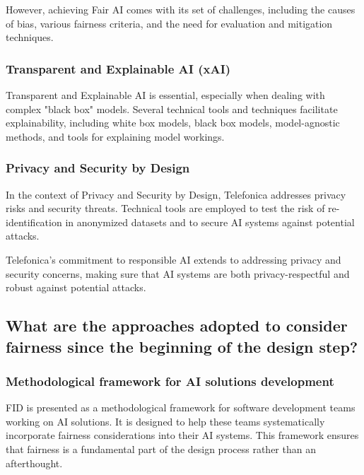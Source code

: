 \documentclass{article}
\begin{document}
However, achieving Fair AI comes with its set of challenges, including the causes of bias, various fairness criteria, and the need for evaluation and mitigation techniques.

\subsubsection{Transparent and Explainable AI (xAI)}

Transparent and Explainable AI is essential, especially when dealing with complex "black box" models. Several technical tools and techniques facilitate explainability, including white box models, black box models, model-agnostic methods, and tools for explaining model workings.

\subsubsection{Privacy and Security by Design}

In the context of Privacy and Security by Design, Telefonica addresses privacy risks and security threats. Technical tools are employed to test the risk of re-identification in anonymized datasets and to secure AI systems against potential attacks.

Telefonica's commitment to responsible AI extends to addressing privacy and security concerns, making sure that AI systems are both privacy-respectful and robust against potential attacks.

\newpage

\subsection{What are the approaches adopted to consider fairness since the beginning of the design step?}

\subsubsection{Methodological framework for AI solutions development}

FID\cite{10091496} is presented as a methodological framework for software development teams working on AI solutions. It is designed to help these teams systematically incorporate fairness considerations into their AI systems. This framework ensures that fairness is a fundamental part of the design process rather than an afterthought.
\end{document}
